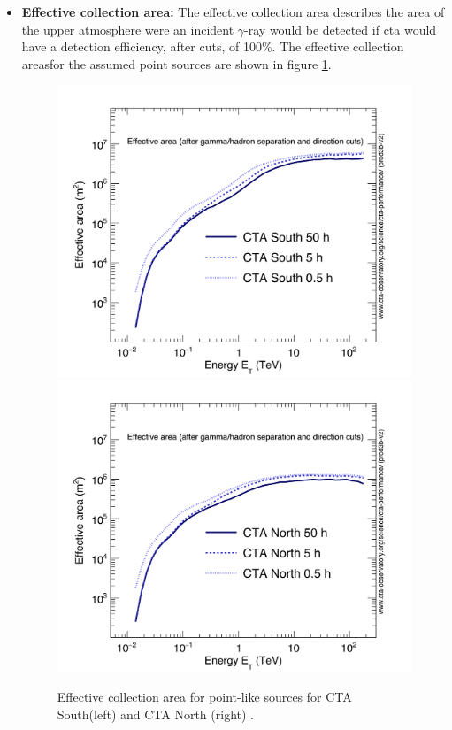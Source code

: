 \documentclass[main.tex]{subfiles}
\begin{document}
\begin{itemize}
\item \textbf{Effective collection area:} The effective collection area describes the area of the upper atmosphere were an incident $\gamma$-ray would be detected if \gls{cta} would have a detection efficiency, after cuts, of 100\%. The effective collection areasfor the assumed point sources are shown in figure \ref{fig:effarea}.\\

\begin{figure}[!htb]
\includegraphics[width=\linewidth]{Pictures/CTA-Performance-prod3b-v2-South-20deg-EffectiveArea.pdf}
\endminipage\hfill
{}
\includegraphics[width=\linewidth]{Pictures/CTA-Performance-prod3b-v2-North-20deg-EffectiveArea.pdf}
\endminipage\hfill
\caption{\label{fig:effarea}Effective collection area for point-like sources for CTA South(left) and CTA North (right) \cite{CTAPerformance}.}
\end{figure}


\end{itemize}
\end{document}
